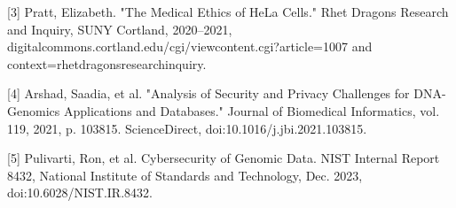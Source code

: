 \documentclass[12pt]{article}
\begin{document}
[3] Pratt, Elizabeth. "The Medical Ethics of HeLa Cells." Rhet Dragons Research and Inquiry, SUNY Cortland, 2020–2021, digitalcommons.cortland.edu/cgi/viewcontent.cgi?article=1007 and context=rhetdragonsresearchinquiry.

[4] Arshad, Saadia, et al. "Analysis of Security and Privacy Challenges for DNA-Genomics Applications and Databases." Journal of Biomedical Informatics, vol. 119, 2021, p. 103815. ScienceDirect, doi:10.1016/j.jbi.2021.103815.

[5] Pulivarti, Ron, et al. Cybersecurity of Genomic Data. NIST Internal Report 8432, National Institute of Standards and Technology, Dec. 2023, doi:10.6028/NIST.IR.8432.
\end{document}
